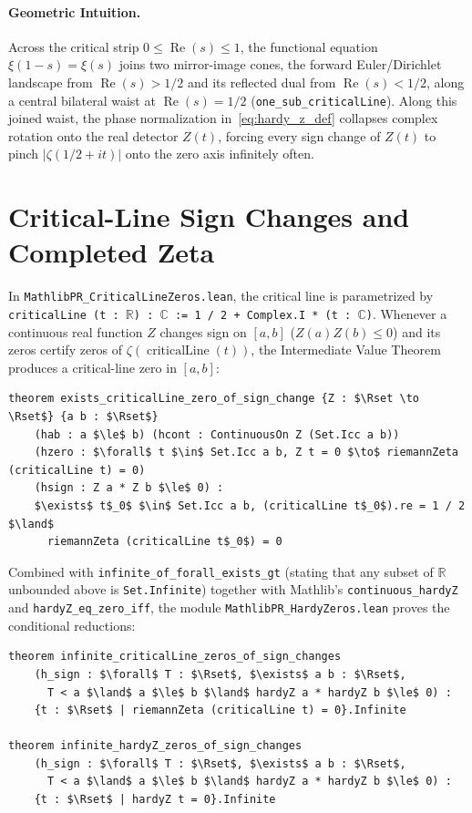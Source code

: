 \documentclass[11pt,a4paper]{article}
\theoremstyle{definition}
\newcommand{\Rset}{\mathbb{R}}
\newcommand{\Cfield}{\mathbb{C}}
\begin{document}
\paragraph{Geometric Intuition.}
Across the critical strip $0 \le \operatorname{Re}(s) \le 1$, the functional equation $\xi(1 - s) = \xi(s)$ joins two mirror-image cones, the forward Euler/Dirichlet landscape from $\operatorname{Re}(s) > 1/2$ and its reflected dual from $\operatorname{Re}(s) < 1/2$, along a central bilateral waist at $\operatorname{Re}(s) = 1/2$ (\texttt{one\_sub\_criticalLine}). Along this joined waist, the phase normalization in~\eqref{eq:hardy_z_def} collapses complex rotation onto the real detector $Z(t)$, forcing every sign change of $Z(t)$ to pinch $|\zeta(1/2 + it)|$ onto the zero axis infinitely often.

\section{Critical-Line Sign Changes and Completed Zeta}\label{sec:bridge}

In \texttt{MathlibPR\_\allowbreak CriticalLineZeros.lean}, the critical line is parametrized by \texttt{criticalLine (t : $\Rset$) : $\Cfield$ := 1 / 2 + Complex.I * (t : $\Cfield$)}. Whenever a continuous real function $Z$ changes sign on $[a,b]$ ($Z(a)Z(b) \le 0$) and its zeros certify zeros of $\zeta(\operatorname{criticalLine}(t))$, the Intermediate Value Theorem produces a critical-line zero in $[a,b]$:
\begin{lstlisting}
theorem exists_criticalLine_zero_of_sign_change {Z : $\Rset \to \Rset$} {a b : $\Rset$}
    (hab : a $\le$ b) (hcont : ContinuousOn Z (Set.Icc a b))
    (hzero : $\forall$ t $\in$ Set.Icc a b, Z t = 0 $\to$ riemannZeta (criticalLine t) = 0)
    (hsign : Z a * Z b $\le$ 0) :
    $\exists$ t$_0$ $\in$ Set.Icc a b, (criticalLine t$_0$).re = 1 / 2 $\land$
      riemannZeta (criticalLine t$_0$) = 0
\end{lstlisting}
Combined with \texttt{infinite\_\allowbreak of\_\allowbreak forall\_\allowbreak exists\_gt} (stating that any subset of $\Rset$ unbounded above is \texttt{Set.Infinite}) together with Mathlib's \texttt{continuous\_hardyZ} and \texttt{hardyZ\_\allowbreak eq\_\allowbreak zero\_\allowbreak iff}, the module \texttt{MathlibPR\_\allowbreak HardyZeros.lean} proves the conditional reductions:
\begin{lstlisting}
theorem infinite_criticalLine_zeros_of_sign_changes
    (h_sign : $\forall$ T : $\Rset$, $\exists$ a b : $\Rset$,
      T < a $\land$ a $\le$ b $\land$ hardyZ a * hardyZ b $\le$ 0) :
    {t : $\Rset$ | riemannZeta (criticalLine t) = 0}.Infinite

theorem infinite_hardyZ_zeros_of_sign_changes
    (h_sign : $\forall$ T : $\Rset$, $\exists$ a b : $\Rset$,
      T < a $\land$ a $\le$ b $\land$ hardyZ a * hardyZ b $\le$ 0) :
    {t : $\Rset$ | hardyZ t = 0}.Infinite
\end{lstlisting}
\end{document}
